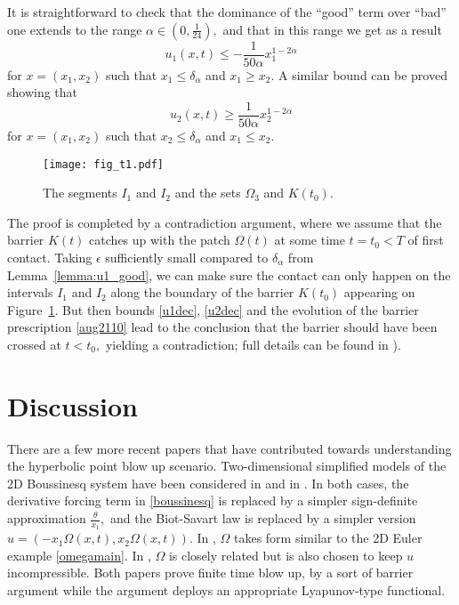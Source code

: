 \documentclass[reqno,centertags, 11pt]{amsart}
\newcommand{\be}{\mathbf e} \newcommand{\bh}{\mathbf h}
\renewcommand{\be}{\begin{equation}}
\newcommand{\ee}{\end{equation}}
\begin{document}
It is straightforward to check that the dominance of the ``good'' term over ``bad'' one extends to the range $\alpha \in (0,\frac{1}{24}),$
and that in this range we get as a result
\be\label{u1dec}
u_1(x,t) \leq -\frac{1}{50\alpha} x_1^{1-2\alpha}
\ee
for $x=(x_1,x_2)$ such that $x_1 \leq \delta_\alpha$ and $x_1 \geq x_2.$ A similar bound can be proved showing that
\be\label{u2dec}
u_2(x,t) \geq \frac{1}{50\alpha} x_2^{1-2\alpha}
\ee
for $x=(x_1,x_2)$ such that $x_2 \leq \delta_\alpha$ and $x_1 \leq x_2.$

\begin{figure}[htbp]
\begin{center}
\texttt{[image: fig\_t1.pdf]}
\caption{The segments $I_1$ and $I_2$ and the sets $\Omega_3$ and $K(t_0)$.\label{fig:t1}}
\end{center}
\end{figure}

The proof is completed by a contradiction argument, where we assume that the barrier $K(t)$ catches up with the patch $\Omega(t)$
at some time $t=t_0 < T$ of first contact. Taking $\epsilon$ sufficiently small compared to $\delta_\alpha$ from Lemma~\ref{lemma:u1_good}, we can make sure
the contact can only happen on the intervals $I_1$ and $I_2$ along the boundary of the barrier $K(t_0)$ appearing on Figure~\ref{fig:t1}.
But then bounds \eqref{u1dec}, \eqref{u2dec} and the evolution of the barrier prescription \eqref{aug2110} lead to the conclusion that
the barrier should have been crossed at $t < t_0,$ yielding a contradiction; full details can be
found in \cite{KRYZ}).


\section{Discussion}\label{disc}

There are a few more recent papers that have contributed towards understanding the hyperbolic point blow up scenario. Two-dimensional simplified models
of the 2D Boussinesq system have been considered in \cite{HORY} and in \cite{KT}. In both cases, the derivative forcing term in \eqref{boussinesq}
is replaced by a simpler sign-definite approximation $\frac{\theta}{x_1},$ and the Biot-Savart law
is replaced by a simpler version $u = (-x_1\Omega(x,t),x_2 \Omega(x,t)).$ In \cite{HORY}, $\Omega$ takes form similar to the 2D Euler example
\eqref{omegamain}. In \cite{KT}, $\Omega$ is closely related but is also chosen to keep $u$ incompressible. Both papers prove finite time blow up,
\cite{HORY} by a sort of barrier argument while the argument \cite{KT} deploys an appropriate Lyapunov-type functional.
\end{document}
